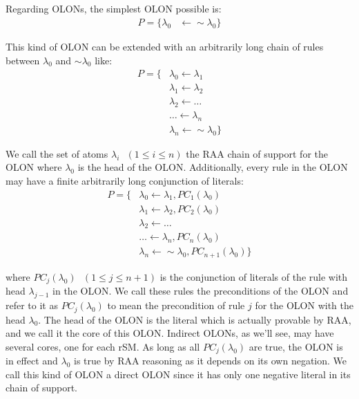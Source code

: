 \subsection{\OLONs}
Regarding OLONs, the simplest OLON possible is:
\begin{align*}
 P=\{\lambda_{0}& \leftarrow\sim \lambda_{0}\}
\end{align*}

This kind of OLON can be extended with an arbitrarily long chain of rules between $\lambda_{0}$ and $\sim \lambda_{0}$ like:
\begin{align*}
P=\{ & \lambda_{0}  \leftarrow \lambda_{1}\\
 & \lambda_{1}  \leftarrow \lambda_{2}\\
 & \lambda_{2}  \leftarrow \ldots\\
 & \ldots \leftarrow \lambda_{n}\\
 & \lambda_{n} \leftarrow \sim \lambda_{0}\}
\end{align*}

We call the set of atoms $\lambda_{i}\text{ }\left(1\leq i\leq n\right)$ the RAA chain of support for the OLON where $\lambda_{0}$ is the head of the OLON. Additionally, every rule in the OLON may have a finite arbitrarily long conjunction of literals:
\begin{align*}
P=\{ &\lambda_{0}  \leftarrow \lambda_{1}, PC_{1}\left(\lambda_{0}\right)\\
 &\lambda_{1}  \leftarrow \lambda_{2}, PC_{2}\left(\lambda_{0}\right)\\
 &\lambda_{2}  \leftarrow \ldots\\
 &\ldots  \leftarrow \lambda_{n}, PC_{n}\left(\lambda_{0}\right)\\
 &\lambda_{n}  \leftarrow \sim \lambda_{0}, PC_{n+1}\left(\lambda_{0}\right)\}
\end{align*}

where $PC_{j}\left(\lambda_{0}\right)\text{ }(1\leq j\leq n+1)$ is the conjunction of literals of the rule with head $\lambda_{j-1}$ in the OLON. We call these rules the preconditions of the OLON and refer to it as $PC_{j}\left(\lambda_{0}\right)$ to mean the precondition of rule $j$ for the OLON with the head $\lambda_{0}$. The head of the OLON is the literal which is actually provable by RAA, and we call it the core of this OLON. Indirect OLONs, as we'll see, may have several cores, one for each rSM. As long as all $PC_{j}\left(\lambda_{0}\right)$ are true, the OLON is in effect and $\lambda_{0}$ is true by RAA reasoning as it depends on its own negation. We call this kind of OLON a direct OLON since it has only one negative literal in its chain of support.

